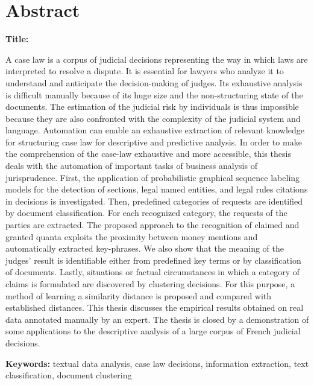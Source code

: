 \chapter*{Abstract}
\textbf{Title:} \textsc{\titleen}

A case law is a corpus of judicial decisions representing the way in which laws are interpreted to resolve a dispute. It is essential for lawyers who analyze it to understand and anticipate the decision-making of judges. Its exhaustive analysis is difficult manually because of its huge size and the non-structuring state of the documents. The estimation of the judicial risk by individuals is thus impossible because they are also confronted with the complexity of the judicial system and language. Automation can enable an exhaustive extraction of relevant knowledge for structuring case law for descriptive and predictive analysis.
In order to make the comprehension of the case-law exhaustive and more accessible, this thesis deals with the automation of important tasks of business analysis of jurisprudence. First, the application of probabilistic graphical sequence labeling models for the detection of sections, legal named entities, and legal rules citations in decisions is investigated. Then, predefined categories of requests are identified by document classification. For each recognized category, the requests of the parties are extracted. The proposed approach to the recognition of claimed and granted quanta exploits the proximity between money mentions and automatically extracted key-phrases. We also show that the meaning of the judges' result is identifiable either from predefined key terms or by classification of documents. Lastly, situations or factual circumstances in which a category of claims is formulated are discovered by clustering decisions. For this purpose, a method of learning a similarity distance is proposed and compared with established distances.
This thesis discusses the empirical results obtained on real data annotated manually by an expert. The thesis is closed by a demonstration of some applications to the descriptive analysis of a large corpus of French judicial decisions.

\textbf{Keywords:} textual data analysis, case law decisions, information extraction, text classification, document clustering